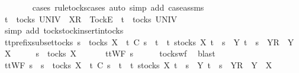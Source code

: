 \begin{isabellebody}
\ \ \ \ \ \ \isamarkupfalse%
\ {\isacharparenleft}cases\ rule{\isacharcolon}tocks{\isachardot}cases{\isacharcomma}\ auto\ simp\ add{\isacharcolon}\ case{\isacharunderscore}assms{\isacharparenleft}{}{\isacharparenright}{\isacharparenright}\isanewline
\ \ \isamarkupfalse%
\isanewline
\ \ \ \ \isamarkupfalse%
\ {\isachardoublequoteopen}t\ {\isasymin}\ tocks\ UNIV\ {\isasymLongrightarrow}\ {\isacharbrackleft}X{\isacharbrackright}\isactrlsub R\ {\isacharhash}\ {\isacharbrackleft}Tock{\isacharbrackright}\isactrlsub E\ {\isacharhash}\ t\ {\isasymin}\ tocks\ UNIV{\isachardoublequoteclose}\isanewline
\ \ \ \ \ \ \isamarkupfalse%
\ {\isacharparenleft}simp\ add{\isacharcolon}\ tocks{\isachardot}tock{\isacharunderscore}insert{\isacharunderscore}in{\isacharunderscore}tocks{\isacharparenright}\isanewline
\ \ \isamarkupfalse%
\isanewline
{}\isamarkupfalse%
%
\endisatagproof
{\isafoldproof}%
%
\isadelimproof
\isanewline
%
\endisadelimproof
\isanewline
{}\isamarkupfalse%
\ tt{\isacharunderscore}prefix{\isacharunderscore}subset{\isacharunderscore}tocks{\isacharcolon}\ {\isachardoublequoteopen}s\ {\isasymin}\ tocks\ X\ {\isasymLongrightarrow}\ t\ {\isasymlesssim}\isactrlsub C\ s\ {\isasymLongrightarrow}\ t\ {\isasymin}\ {\isacharbraceleft}t{\isachardot}\ {\isasymexists}s{\isasymin}tocks\ X{\isachardot}\ t\ {\isacharequal}\ s\ {\isasymor}\ {\isacharparenleft}{\isasymexists}Y{\isachardot}\ t\ {\isacharequal}\ s\ {\isacharat}\ {\isacharbrackleft}{\isacharbrackleft}Y{\isacharbrackright}\isactrlsub R{\isacharbrackright}\ {\isasymand}\ Y\ {\isasymsubseteq}\ X{\isacharparenright}{\isacharbraceright}{\isachardoublequoteclose}\isanewline
%
\isadelimproof
%
\endisadelimproof
%
\isatagproof
{}\isamarkupfalse%
\ {\isacharminus}\isanewline
\ \ \isamarkupfalse%
\ {\isachardoublequoteopen}s\ {\isasymin}\ tocks\ X{\isachardoublequoteclose}\ \isanewline
\ \ \isamarkupfalse%
\ \isamarkupfalse%
\ {\isachardoublequoteopen}ttWF\ s{\isachardoublequoteclose}\isanewline
\ \ \ \ \isamarkupfalse%
\ tocks{\isacharunderscore}wf\ \isamarkupfalse%
\ blast\isanewline
\ \ \isamarkupfalse%
\ \isamarkupfalse%
\ {\isachardoublequoteopen}ttWF\ s\ {\isasymlongrightarrow}\ s\ {\isasymin}\ tocks\ X\ {\isasymlongrightarrow}\ t\ {\isasymlesssim}\isactrlsub C\ s\ {\isasymlongrightarrow}\ t\ {\isasymin}\ {\isacharbraceleft}t{\isachardot}\ {\isasymexists}s{\isasymin}tocks\ X{\isachardot}\ t\ {\isacharequal}\ s\ {\isasymor}\ {\isacharparenleft}{\isasymexists}Y{\isachardot}\ t\ {\isacharequal}\ s\ {\isacharat}\ {\isacharbrackleft}{\isacharbrackleft}Y{\isacharbrackright}\isactrlsub R{\isacharbrackright}\ {\isasymand}\ Y\ {\isasymsubseteq}\ X{\isacharparenright}{\isacharbraceright}{\isachardoublequoteclose}\isanewline

\end{isabellebody}

